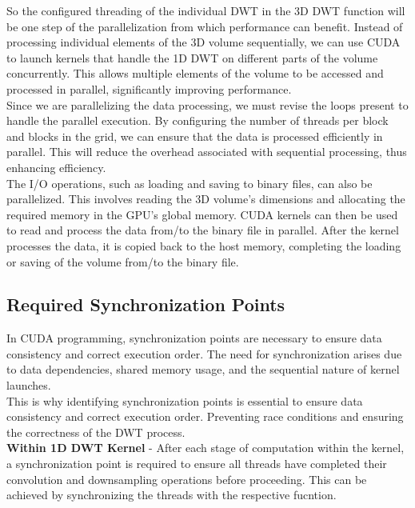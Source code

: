 \documentclass{article}
\begin{document}
So the configured threading of the individual DWT in the 3D DWT function will be one step of the parallelization from which performance can benefit. Instead of processing individual elements of the 3D volume sequentially, we can use CUDA to launch kernels that handle the 1D DWT on different parts of the volume concurrently. This allows multiple elements of the volume to be accessed and processed in parallel, significantly improving performance.\\

Since we are parallelizing the data processing, we must revise the loops present to handle the parallel execution. By configuring the number of threads per block and blocks in the grid, we can ensure that the data is processed efficiently in parallel. This will reduce the overhead associated with sequential processing, thus enhancing efficiency.\\

The I/O operations, such as loading and saving to binary files, can also be parallelized. This involves reading the 3D volume's dimensions and allocating the required memory in the GPU's global memory. CUDA kernels can then be used to read and process the data from/to the binary file in parallel. After the kernel processes the data, it is copied back to the host memory, completing the loading or saving of the volume from/to the binary file.\\

\subsection{Required Synchronization Points}
In CUDA programming, synchronization points are necessary to ensure data consistency and correct execution order. The need for synchronization arises due to data dependencies, shared memory usage, and the sequential nature of kernel launches.\\

This is why identifying synchronization points is essential to ensure data consistency and correct execution order. Preventing race conditions and ensuring the correctness of the DWT process.\\

\textbf{Within 1D DWT Kernel} - After each stage of computation within the kernel, a synchronization point is required to ensure all threads have completed their convolution and downsampling operations before proceeding. This can be achieved by synchronizing the threads with the respective fucntion.\\
\end{document}
